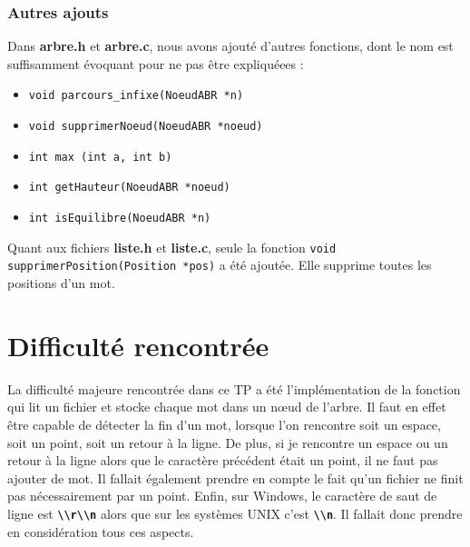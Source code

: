 \subsubsection{Autres ajouts}
Dans \textbf{arbre.h} et \textbf{arbre.c}, nous avons ajouté d'autres fonctions, dont le nom est suffisamment évoquant pour ne pas être expliquéees :
\begin{itemize}
  \item \lstinline{void parcours_infixe(NoeudABR *n)}
  \item \lstinline{void supprimerNoeud(NoeudABR *noeud)}
  \item \lstinline{int max (int a, int b)}
  \item \lstinline{int getHauteur(NoeudABR *noeud)}
  \item \lstinline{int isEquilibre(NoeudABR *n)}
\end{itemize}

Quant aux fichiers \textbf{liste.h} et \textbf{liste.c}, seule la fonction \lstinline{void supprimerPosition(Position *pos)} a été ajoutée. Elle supprime toutes les positions d'un mot.

\section{Difficulté rencontrée}
La difficulté majeure rencontrée dans ce TP a été l'implémentation de la fonction qui lit un fichier et stocke chaque mot dans un n\oe ud de l'arbre. Il faut en effet être capable de détecter la fin d'un mot, lorsque l'on rencontre soit un espace, soit un point, soit un retour à la ligne. De plus, si je rencontre un espace ou un retour à la ligne alors que le caractère précédent était un point, il ne faut pas ajouter de mot. Il fallait également prendre en compte le fait qu'un fichier ne finit pas nécessairement par un point. Enfin, sur Windows, le caractère de saut de ligne est \textbf{\lstinline{\\r\\n}} alors que sur les systèmes UNIX c'est \textbf{\lstinline{\\n}}. Il fallait donc prendre en considération tous ces aspects.

\medskip

\noindent{}

\medskip

